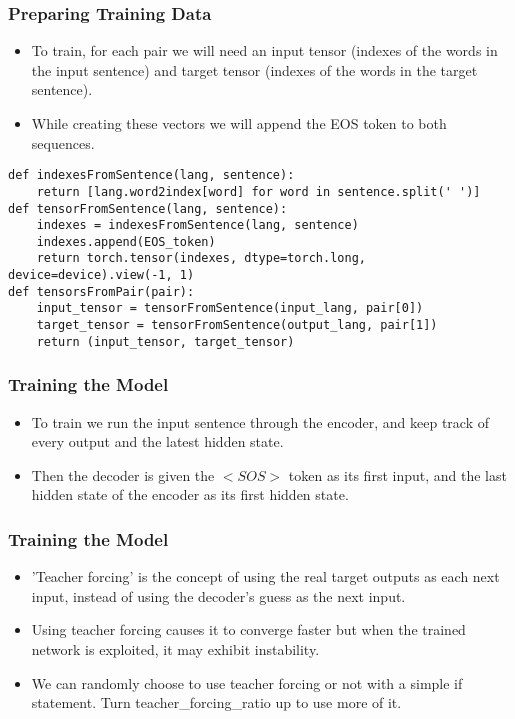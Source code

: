 \begin{frame}[fragile]
\frametitle{Preparing Training Data}

\begin{itemize}
\item To train, for each pair we will need an input tensor (indexes of the words in the input sentence) and target tensor (indexes of the words in the target sentence).
\item While creating these vectors we will append the EOS token to both sequences.
\end{itemize}
\begin{lstlisting}    
def indexesFromSentence(lang, sentence):
    return [lang.word2index[word] for word in sentence.split(' ')]
def tensorFromSentence(lang, sentence):
    indexes = indexesFromSentence(lang, sentence)
    indexes.append(EOS_token)
    return torch.tensor(indexes, dtype=torch.long, device=device).view(-1, 1)
def tensorsFromPair(pair):
    input_tensor = tensorFromSentence(input_lang, pair[0])
    target_tensor = tensorFromSentence(output_lang, pair[1])
    return (input_tensor, target_tensor)
 \end{lstlisting} 
              
\end{frame} 

\begin{frame}[fragile]
\frametitle{Training the Model}

\begin{itemize}
\item To train we run the input sentence through the encoder, and keep track of every output and the latest hidden state. 
\item Then the decoder is given the $<SOS>$ token as its first input, and the last hidden state of the encoder as its first hidden state.
\end{itemize}
        
\end{frame} 

\begin{frame}[fragile]
\frametitle{Training the Model}

\begin{itemize}
\item 'Teacher forcing' is the concept of using the real target outputs as each next input, instead of using the decoder's guess as the next input. 
\item Using teacher forcing causes it to converge faster but when the trained network is exploited, it may exhibit instability.
\item We can randomly choose to use teacher forcing or not with a simple if statement. Turn teacher\_forcing\_ratio up to use more of it.
\end{itemize}
        
\end{frame} 

